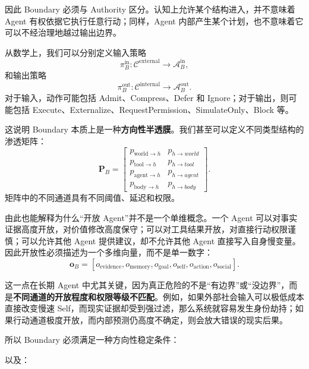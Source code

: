 因此 Boundary 必须与 Authority 区分。认知上允许某个结构进入，并不意味着 Agent 有权依据它执行任意行动；同样，Agent 内部产生某个计划，也不意味着它可以不经治理地越过输出边界。

从数学上，我们可以分别定义输入策略
\[
\pi_B^{\mathrm{in}}
:
\mathcal{C}^{\mathrm{external}}
\rightarrow
\mathcal{A}_B^{\mathrm{in}},
\]
和输出策略
\[
\pi_B^{\mathrm{out}}
:
\mathcal{C}^{\mathrm{internal}}
\rightarrow
\mathcal{A}_B^{\mathrm{out}}.
\]
对于输入，动作可能包括 Admit、Compress、Defer 和 Ignore；对于输出，则可能包括 Execute、Externalize、RequestPermission、SimulateOnly、Block 等。

这说明 Boundary 本质上是一种\textbf{方向性半透膜}。我们甚至可以定义不同类型结构的渗透矩阵：
\[
\mathbf{P}_B
=
\begin{bmatrix}
p_{\mathrm{world}\rightarrow h}
&
p_{h\rightarrow world}\\
p_{\mathrm{tool}\rightarrow h}
&
p_{h\rightarrow tool}\\
p_{\mathrm{agent}\rightarrow h}
&
p_{h\rightarrow agent}\\
p_{\mathrm{body}\rightarrow h}
&
p_{h\rightarrow body}
\end{bmatrix}.
\]
矩阵中的不同通道具有不同阈值、延迟和权限。

由此也能解释为什么“开放 Agent”并不是一个单维概念。一个 Agent 可以对事实证据高度开放，对价值修改高度保守；可以对工具结果开放，对直接行动权限谨慎；可以允许其他 Agent 提供建议，却不允许其他 Agent 直接写入自身慢变量。因此开放性必须描述为一个多维向量，而不是单一数字：
\[
\mathbf{o}_B
=
[
o_{\mathrm{evidence}},
o_{\mathrm{memory}},
o_{\mathrm{goal}},
o_{\mathrm{self}},
o_{\mathrm{action}},
o_{\mathrm{social}}
].
\]

这一点在长期 Agent 中尤其关键，因为真正危险的不是“有边界”或“没边界”，而是\textbf{不同通道的开放程度和权限等级不匹配}。例如，如果外部社会输入可以极低成本直接改变慢速 Self，而现实证据却受到强过滤，那么系统就容易发生身份劫持；如果行动通道极度开放，而内部预测仍高度不确定，则会放大错误的现实后果。

所以 Boundary 必须满足一种方向性稳定条件：
\begin{statementbox}
\centering
{}
\end{statementbox}
以及：
\begin{statementbox}
\centering
{}
\end{statementbox}

